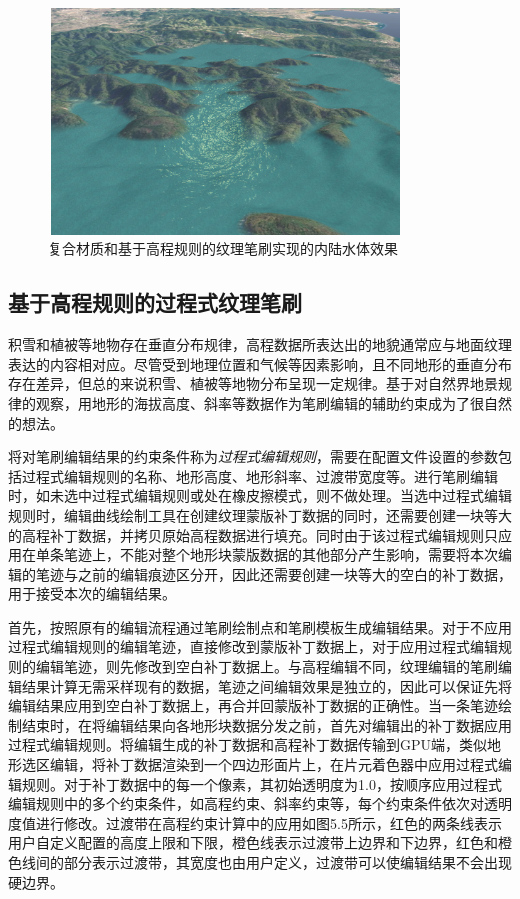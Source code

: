 \begin{figure}[htb]
    \centering
    \includegraphics[height=6cm,width=9.4cm]{figures/water.png}
    \caption{复合材质和基于高程规则的纹理笔刷实现的内陆水体效果}
\end{figure}
\subsection{基于高程规则的过程式纹理笔刷}
积雪和植被等地物存在垂直分布规律，高程数据所表达出的地貌通常应与地面纹理表达的内容相对应。尽管受到地理位置和气候等因素影响，且不同地形的垂直分布存在差异，但总的来说积雪、植被等地物分布呈现一定规律。基于对自然界地景规律的观察，用地形的海拔高度、斜率等数据作为笔刷编辑的辅助约束成为了很自然的想法。\par
将对笔刷编辑结果的约束条件称为\textit{过程式编辑规则}，需要在配置文件设置的参数包括过程式编辑规则的名称、地形高度、地形斜率、过渡带宽度等。进行笔刷编辑时，如未选中过程式编辑规则或处在橡皮擦模式，则不做处理。当选中过程式编辑规则时，编辑曲线绘制工具在创建纹理蒙版补丁数据的同时，还需要创建一块等大的高程补丁数据，并拷贝原始高程数据进行填充。同时由于该过程式编辑规则只应用在单条笔迹上，不能对整个地形块蒙版数据的其他部分产生影响，需要将本次编辑的笔迹与之前的编辑痕迹区分开，因此还需要创建一块等大的空白的补丁数据，用于接受本次的编辑结果。\par
首先，按照原有的编辑流程通过笔刷绘制点和笔刷模板生成编辑结果。对于不应用过程式编辑规则的编辑笔迹，直接修改到蒙版补丁数据上，对于应用过程式编辑规则的编辑笔迹，则先修改到空白补丁数据上。与高程编辑不同，纹理编辑的笔刷编辑结果计算无需采样现有的数据，笔迹之间编辑效果是独立的，因此可以保证先将编辑结果应用到空白补丁数据上，再合并回蒙版补丁数据的正确性。当一条笔迹绘制结束时，在将编辑结果向各地形块数据分发之前，首先对编辑出的补丁数据应用过程式编辑规则。将编辑生成的补丁数据和高程补丁数据传输到GPU端，类似地形选区编辑，将补丁数据渲染到一个四边形面片上，在片元着色器中应用过程式编辑规则。对于补丁数据中的每一个像素，其初始透明度为1.0，按顺序应用过程式编辑规则中的多个约束条件，如高程约束、斜率约束等，每个约束条件依次对透明度值进行修改。过渡带在高程约束计算中的应用如图5.5所示，红色的两条线表示用户自定义配置的高度上限和下限，橙色线表示过渡带上边界和下边界，红色和橙色线间的部分表示过渡带，其宽度也由用户定义，过渡带可以使编辑结果不会出现硬边界。

